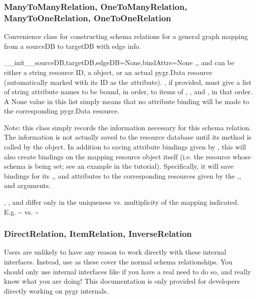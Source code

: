 \documentclass{howto}
\begin{document}
\subsubsection{ManyToManyRelation, OneToManyRelation, ManyToOneRelation, OneToOneRelation}
Convenience class for constructing schema relations for
a general graph mapping from a sourceDB to targetDB with edge info.
\begin{funcdesc}{__init__}{sourceDB,targetDB,edgeDB=None,bindAttrs=None}
  ,, and  can be either
  a string resource ID, a  object, or
  an actual pygr.Data resource (automatically marked with its ID
  as the  attribute).
  , if provided, must give a list of string attribute names to be
  bound, in order, to items of , ,
  and , in that order.  A None value in this list simply
  means that no attribute binding will be made to the corresponding
  pygr.Data resource.
\end{funcdesc}
Note: this class simply records the information necessary for this
schema relation.  The information is not actually saved to the resource
database until its  method is called by 
the  object.  In addition to saving attribute
bindings given by , this will also create bindings
on the mapping resource object itself (i.e. the resource whose
schema is being set; see an example in the tutorial).  Specifically,
it will save bindings for its ,,
and  attributes to the corresponding resources
given by the ,,
and  arguments.

, , 
and  differ only in the uniqueness vs. multiplicity
of the mapping indicated.
E.g.  \textasciitilde{} vs. 
\textasciitilde{}

\subsubsection{DirectRelation, ItemRelation, InverseRelation}
Users are unlikely to have any reason to work directly with these
internal interfaces.  Instead, use 
as these cover the normal schema relationships.
You should only use internal interfaces like 
 if you
have a real need to do so, and really know what you are doing!
This documentation is only provided for developers directly working
on pygr internals.
\end{document}
